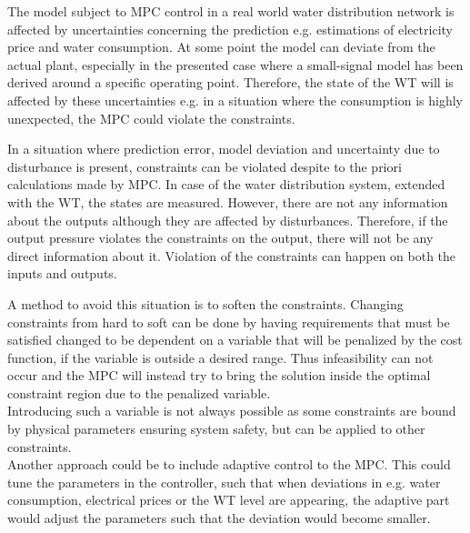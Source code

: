 The model subject to MPC control in a real world water distribution network is affected by uncertainties concerning the prediction e.g. estimations of electricity price and water consumption. At some point the model can deviate from the actual plant, especially in the presented case where a small-signal model has been derived around a specific operating point. Therefore, the state of the WT will is affected by these uncertainties e.g. in a situation where the consumption is highly unexpected, the MPC could violate the constraints.

In a situation where prediction error, model deviation and uncertainty due to disturbance is present, constraints can be violated despite to the priori calculations made by MPC. In case of the water distribution system, extended with the WT, the states are measured. However, there are not any information about the outputs although they are affected by disturbances. Therefore, if the output pressure violates the constraints on the output, there will not be any direct information about it. Violation of the constraints can happen on both the inputs and outputs.

A method to avoid this situation is to soften the constraints. Changing constraints from hard to soft can be done by having requirements that must be satisfied changed to be dependent on a variable that will be penalized by the cost function, if the variable is outside a desired range. Thus infeasibility can not occur and the MPC will instead try to bring the solution inside the optimal constraint region due to the penalized variable.\\   
Introducing such a variable is not always possible as some constraints are bound by physical parameters ensuring system safety, but can be applied to other constraints.\\

Another approach could be to include adaptive control to the MPC. This could tune the parameters in the controller, such that when deviations in e.g. water consumption, electrical prices or the WT level are appearing, the adaptive part would adjust the parameters such that the deviation would become smaller.






